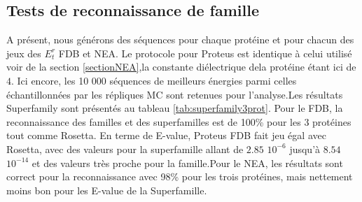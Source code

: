 \begin{table}[!htbp]
\begin{tabular}{ccc|cc}
        \bottomrule

      \end{tabular}      

\label{tab:RefEner3prot}      
    \end{table}

\subsection{Tests de reconnaissance de famille}
A présent, nous générons des séquences pour chaque protéine et pour chacun des jeux des $E_t^r$ FDB et NEA. Le protocole pour Proteus est identique à celui utilisé voir de la section \ref{sectionNEA},la constante diélectrique dela protéine étant ici de $4$. Ici encore, les 10 000 séquences de meilleurs énergies parmi celles échantillonnées par les répliques MC sont retenues pour l'analyse.Les résultats Superfamily sont présentés au tableau \ref{tab:superfamily3prot}. Pour le FDB, la reconnaissance des familles et des superfamilles est de 100\% pour les 3 protéines tout comme Rosetta. En terme de E-value, Proteus FDB fait jeu égal avec Rosetta, avec des valeurs pour la superfamille allant de $2.85$ $10^{-6}$ jusqu'à $8.54$ $10^{-14}$ et des valeurs très proche pour la famille.Pour le NEA, les résultats sont correct pour la reconnaissance avec 98\% pour les trois protéines, mais nettement moins bon pour les E-value de la Superfamille. 



